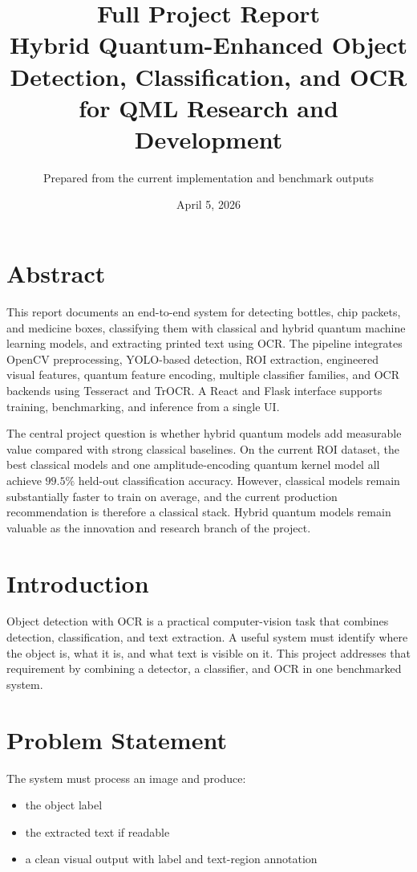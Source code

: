 \documentclass[12pt,a4paper]{article}
\title{\textbf{Full Project Report}\\Hybrid Quantum-Enhanced Object Detection, Classification, and OCR for QML Research and Development}
\author{Prepared from the current implementation and benchmark outputs}
\date{April 5, 2026}
\begin{document}
\maketitle
\tableofcontents
\newpage

\section{Abstract}

This report documents an end-to-end system for detecting bottles, chip packets, and medicine boxes, classifying them with classical and hybrid quantum machine learning models, and extracting printed text using OCR. The pipeline integrates OpenCV preprocessing, YOLO-based detection, ROI extraction, engineered visual features, quantum feature encoding, multiple classifier families, and OCR backends using Tesseract and TrOCR. A React and Flask interface supports training, benchmarking, and inference from a single UI.

The central project question is whether hybrid quantum models add measurable value compared with strong classical baselines. On the current ROI dataset, the best classical models and one amplitude-encoding quantum kernel model all achieve \(99.5\%\) held-out classification accuracy. However, classical models remain substantially faster to train on average, and the current production recommendation is therefore a classical stack. Hybrid quantum models remain valuable as the innovation and research branch of the project.

\section{Introduction}

Object detection with OCR is a practical computer-vision task that combines detection, classification, and text extraction. A useful system must identify where the object is, what it is, and what text is visible on it. This project addresses that requirement by combining a detector, a classifier, and OCR in one benchmarked system.

\section{Problem Statement}

The system must process an image and produce:
\begin{itemize}
  \item the object label
  \item the extracted text if readable
  \item a clean visual output with label and text-region annotation
\end{itemize}
\end{document}
